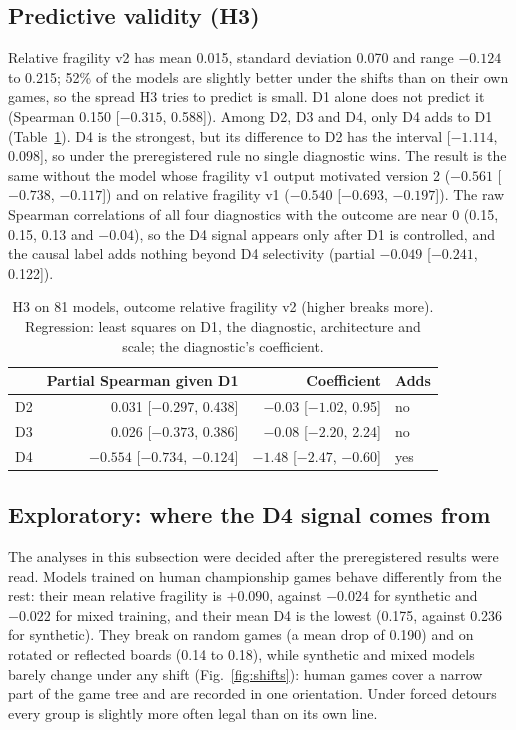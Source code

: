 \documentclass[journal]{IEEEtran}
\begin{document}
\subsection{Predictive validity (H3)}
\label{sec:h3}
Relative fragility v2 has mean 0.015, standard deviation 0.070 and range $-0.124$ to 0.215; 52\% of the models are
slightly better under the shifts than on their own games, so the spread H3 tries to predict is small. D1 alone does
not predict it (Spearman 0.150 [$-0.315$, 0.588]). Among D2, D3 and D4, only D4 adds to D1 (Table~\ref{tab:h3}).
D4 is the strongest, but its difference to D2 has the interval [$-1.114$, 0.098], so under the preregistered rule no
single diagnostic wins. The result is the same without the model whose fragility v1 output motivated version 2
($-0.561$ [$-0.738$, $-0.117$]) and on relative fragility v1 ($-0.540$ [$-0.693$, $-0.197$]). The raw Spearman
correlations of all four diagnostics with the outcome are near 0 (0.15, 0.15, 0.13 and $-0.04$), so the D4 signal
appears only after D1 is controlled, and the causal label adds nothing beyond D4 selectivity (partial $-0.049$
[$-0.241$, 0.122]).

\begin{table}[t]
    \centering
    \caption{H3 on 81 models, outcome relative fragility v2 (higher breaks more). Regression: least squares on D1, the
    diagnostic, architecture and scale; the diagnostic's coefficient.}
    \label{tab:h3}
    \footnotesize
    \setlength{\tabcolsep}{2.5pt}
    \begin{tabular}{lrrl}
    \toprule
    & Partial Spearman given D1 & Coefficient & Adds \\
    \midrule
    D2 & 0.031 [$-0.297$, 0.438] & $-0.03$ [$-1.02$, 0.95] & no \\
    D3 & 0.026 [$-0.373$, 0.386] & $-0.08$ [$-2.20$, 2.24] & no \\
    D4 & $-0.554$ [$-0.734$, $-0.124$] & $-1.48$ [$-2.47$, $-0.60$] & yes \\
    \bottomrule
    \end{tabular}
\end{table}

\subsection{Exploratory: where the D4 signal comes from}
\label{sec:explore}
The analyses in this subsection were decided after the preregistered results were read. Models trained on human
championship games behave differently from the rest: their mean relative fragility is $+0.090$, against $-0.024$
for synthetic and $-0.022$ for mixed training, and their mean D4 is the lowest (0.175, against 0.236 for synthetic).
They break on random games (a mean drop of 0.190) and on rotated or reflected boards (0.14 to 0.18), while synthetic
and mixed models barely change under any shift (Fig.~\ref{fig:shifts}): human games cover a narrow part of the game
tree and are recorded in one orientation. Under forced detours every group is slightly more often legal than on its
own line.
\end{document}
